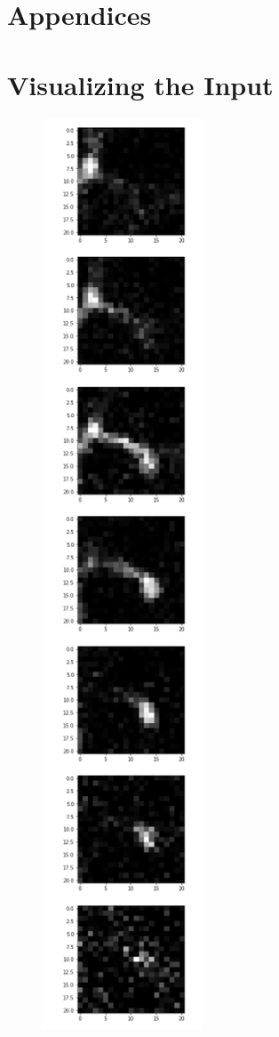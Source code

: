 \documentclass{neu_handout}
\begin{document}
\newpage

\appendix
\section*{Appendices}

\section{Visualizing the Input}

\begin{figure}[!h]
  \includegraphics[width=0.15\linewidth]{neuron-slices}
  \label{fig:neuron-slices}
\end{figure}
\end{document}
